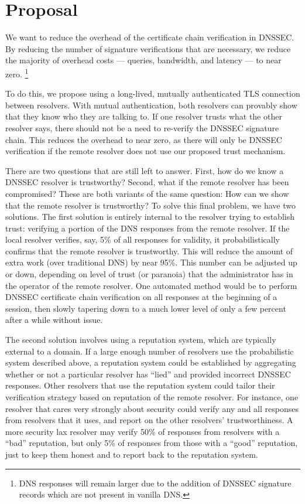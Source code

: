 \section{Proposal}\label{sec:proposal}

We want to reduce the overhead of the certificate chain verification in DNSSEC.
By reducing the number of signature  verifications that are necessary, we reduce
the majority of overhead costs --- queries, bandwidth, and latency --- to near 
zero. \footnote{DNS responses will remain larger due to the addition of  DNSSEC
signature records which are not present in vanilla DNS.}

To do this, we propose using a long-lived, mutually authenticated TLS connection
between resolvers. With mutual authentication, both resolvers can provably show
that they know who they are talking to. If one resolver trusts what the  other 
resolver says, there should not be a need to re-verify the DNSSEC signature
chain. This reduces the overhead to near zero, as there will only be
DNSSEC verification if the remote resolver does not use our proposed trust
mechanism.

There are two questions that are still left to answer. First, how do we know a
DNSSEC resolver is trustworthy? Second, what if the remote resolver has been 
compromised? These are both variants of the same question: How can we show that
the remote resolver is trustworthy?
To solve this final problem, we have two solutions. The first solution is
entirely internal to the resolver trying to establish trust: verifying a 
portion of the DNS responses from the remote resolver. If the local resolver 
verifies, say, 5\% of all responses for validity, it probabilistically confirms 
that the remote resolver is trustworthy. This will reduce the amount of extra 
work (over traditional DNS) by near 95\%. This number can be adjusted up or 
down, depending on level of trust (or paranoia) that the administrator has in
the operator of the remote resolver. One automated method would be to perform
DNSSEC certificate chain verification on all responses at the beginning of a 
session, then slowly tapering down to a much lower level of only a few percent
after a while without issue.

The second solution involves using a reputation system, which are typically 
external to a domain. If a large enough number of resolvers use the 
probabilistic system described above, a reputation system could be established 
by aggregating whether or not a particular resolver has ``lied'' and provided 
incorrect DNSSEC responses. 
Other resolvers that use the reputation system could tailor their 
verification strategy based on reputation of the remote resolver. 
For instance, one resolver that cares very strongly about 
security could verify any and all responses from resolvers that it uses, and 
report on the other resolvers' trustworthiness.
A more security lax resolver may verify 50\% of responses from resolvers with a
``bad'' reputation, but only 5\% of responses from those with a ``good'' 
reputation, just to keep them honest and to report back to the reputation 
system. 

